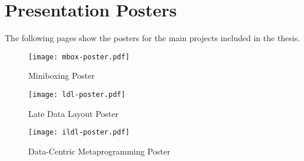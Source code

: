 \appendix
\chapter{Presentation Posters}

The following pages show the posters for the main projects included in the thesis.

\begin{figure}[t]
  \centering
  \vfill
  \texttt{[image: mbox-poster.pdf]}
  \caption{Miniboxing Poster}
\end{figure}

\begin{figure}[t]
  \centering
  \vfill
  \texttt{[image: ldl-poster.pdf]}
  \caption{Late Data Layout Poster}
\end{figure}

\begin{figure}[t]
  \centering
  \vfill
  \texttt{[image: ildl-poster.pdf]}
  \caption{Data-Centric Metaprogramming Poster}
\end{figure}
